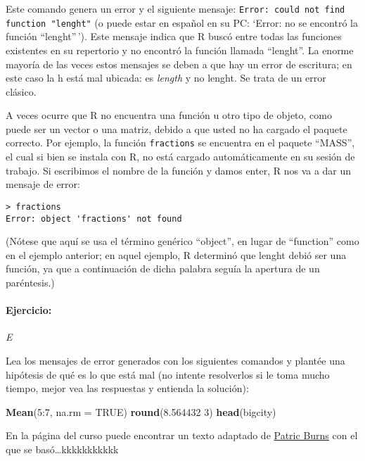 \documentclass[]{article}
\newenvironment{Shaded}{}{}
\newcommand{\KeywordTok}[1]{\textcolor[rgb]{0.00,0.44,0.13}{\textbf{{#1}}}}
\newcommand{\DataTypeTok}[1]{\textcolor[rgb]{0.56,0.13,0.00}{{#1}}}
\newcommand{\DecValTok}[1]{\textcolor[rgb]{0.25,0.63,0.44}{{#1}}}
\newcommand{\FloatTok}[1]{\textcolor[rgb]{0.25,0.63,0.44}{{#1}}}
\newcommand{\OtherTok}[1]{\textcolor[rgb]{0.00,0.44,0.13}{{#1}}}
\newcommand{\NormalTok}[1]{{#1}}
\begin{document}
Este comando genera un error y el siguiente mensaje:
\texttt{Error: could not find function "lenght"} (o puede estar en
español en su PC: `Error: no se encontró la función ``lenght''\,'). Este
mensaje indica que R buscó entre todas las funciones existentes en su
repertorio y no encontró la función llamada ``lenght''. La enorme
mayoría de las veces estos mensajes se deben a que hay un error de
escritura; en este caso la h está mal ubicada: es \emph{length} y no
lenght. Se trata de un error clásico.

A veces ocurre que R no encuentra una función u otro tipo de objeto,
como puede ser un vector o una matriz, debido a que usted no ha cargado
el paquete correcto. Por ejemplo, la función \texttt{fractions} se
encuentra en el paquete ``MASS'', el cual si bien se instala con R, no
está cargado automáticamente en su sesión de trabajo. Si escribimos el
nombre de la función y damos enter, R nos va a dar un mensaje de error:

\begin{verbatim}
> fractions
Error: object 'fractions' not found
\end{verbatim}
(Nótese que aquí se usa el término genérico ``object'', en lugar de
``function'' como en el ejemplo anterior; en aquel ejemplo, R determinó
que lenght debió ser una función, ya que a continuación de dicha palabra
seguía la apertura de un paréntesis.)

\paragraph{Ejercicio:}

\emph{E}

Lea los mensajes de error generados con los siguientes comandos y
plantée una hipótesis de qué es lo que está mal (no intente resolverlos
si le toma mucho tiempo, mejor vea las respuestas y entienda la
solución):

\begin{Shaded}
\begin{Highlighting}[]
\KeywordTok{Mean}\NormalTok{(}\DecValTok{5}\NormalTok{:}\DecValTok{7}\NormalTok{, }\DataTypeTok{na.rm =} \OtherTok{TRUE}\NormalTok{)}
\KeywordTok{round}\NormalTok{(}\FloatTok{8.564432} \DecValTok{3}\NormalTok{)}
\KeywordTok{head}\NormalTok{(bigcity)}
\end{Highlighting}
\end{Shaded}
En la página del curso puede encontrar un texto adaptado de
\href{www.PONERLINKACÁ!!!!.com}{Patric Burns} con el que se
basó\ldots{}kkkkkkkkkkk
\end{document}
